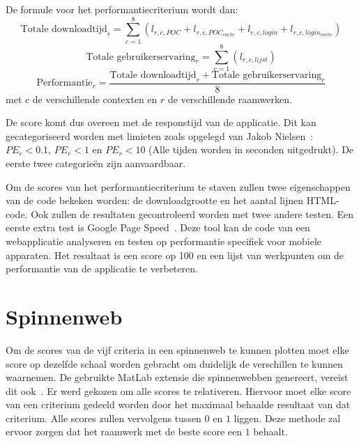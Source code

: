 De formule voor het performantiecriterium wordt dan:
\begin{equation}
  \text{Totale downloadtijd}_r= \sum_{c=1}^{8}{\left(l_{r,c,POC}+l_{r,c,POC_{cache}}+l_{r,c,login}+l_{r,c,login_{cache}}\right)}
    \label{eq:totale-downloadtijd}
\end{equation}
\begin{equation}
  \text{Totale gebruikerservaring}_r= \sum_{c=1}^{8}{\left(l_{r,c,lijst}\right)}
  \label{eq:totale-gebruikerservaring}
\end{equation}
\begin{equation}
  \text{Performantie}_r= \frac{\text{Totale downloadtijd}_r + \text{Totale gebruikerservaring}_r}{8}
  \label{eq:performantie}
\end{equation}
met $c$ de verschillende contexten en $r$ de verschillende raamwerken.

De score komt dus overeen met de responstijd van de applicatie.
Dit kan gecategoriseerd worden met limieten zoals opgelegd van Jakob Nielsen~\cite{Nielsen1993}:  $PE_r < 0.1$,  $PE_r < 1$ en $PE_r < 10$ (Alle tijden worden in seconden uitgedrukt).
De eerste twee categorieën zijn aanvaardbaar.

Om de scores van het performantiecriterium te staven zullen twee eigenschappen van de code bekeken worden:  de downloadgrootte en het aantal lijnen HTML-code.
Ook zullen de resultaten gecontroleerd worden met twee andere testen.
Een eerste extra test is Google Page Speed~\cite{Morgan2011}. 
Deze tool kan de code van een webapplicatie analyseren en testen op performantie specifiek voor mobiele apparaten.
Het resultaat is een score op 100 en een lijst van werkpunten om de performantie van de applicatie te verbeteren.


\section{Spinnenweb}
\label{sec:vergelijking-spinnenweb}

Om de scores van de vijf criteria in een spinnenweb te kunnen plotten moet elke score op dezelfde schaal worden gebracht om duidelijk de verschillen te kunnen waarnemen.
De gebruikte MatLab extensie die spinnenwebben genereert, vereist dit ook~\cite{Martti2007}.
Er werd gekozen om alle scores te relativeren.
Hiervoor moet elke score van een criterium gedeeld worden door het maximaal behaalde resultaat van dat criterium.
Alle scores zullen vervolgens tussen $0$ en $1$ liggen.
Deze methode zal ervoor zorgen dat het raamwerk met de beste score een $1$ behaalt.

